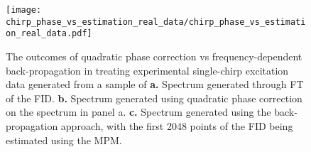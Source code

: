\begin{figure}
    \centering
    \texttt{[image: chirp\_phase\_vs\_estimation\_real\_data/chirp\_phase\_vs\_estimation\_real\_data.pdf]}
    \caption[
        The outcomes of quadratic phase correction vs frequency-dependent
        back-propagation in treating experimental single-chirp excitation data
        generated from a sample of Gd-doped H\textsubscript{2}O in
        D\textsubscript{2}O.
    ]{
        The outcomes of quadratic phase correction vs frequency-dependent
        back-propagation in treating experimental single-chirp excitation data
        generated from a sample of
        \label{corr:chirp-exp-desc}%
        \textbf{a.} Spectrum generated through \ac{FT} of the \ac{FID}.
        \textbf{b.} Spectrum generated using quadratic phase correction on the
        spectrum in panel a.
        \textbf{c.} Spectrum generated using the back-propagation approach,
        with the first 2048 points of the \ac{FID} being estimated using the
        \ac{MPM}.
    }
    \label{fig:bbqchili-real}
\end{figure}
